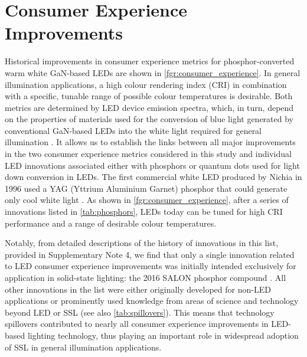 \documentclass[parskip=full]{article}
\begin{document}
\section{Consumer Experience Improvements}

Historical improvements in consumer experience metrics for phosphor-converted warm white GaN-based LEDs are shown in \cref{fgr:consumer_experience}. In general illumination applications, a high colour rendering index (CRI) in combination with a specific, tunable range of possible colour temperatures is desirable. Both metrics are determined by LED device emission spectra, which, in turn, depend on the properties of materials used for the conversion of blue light generated by conventional GaN-based LEDs into the white light required for general illumination . It allows us to establish the links between all major improvements in the two consumer experience metrics considered in this study and individual LED innovations  associated either with phosphors or quantum dots used for light down conversion in LEDs. The first commercial white LED produced by Nichia in 1996 used a YAG (Yttrium Aluminium Garnet) phosphor that could generate only cool white light \cite{bando1998development}. As shown in \cref{fgr:consumer_experience}, after a series of innovations listed in \cref{tab:phosphors}, LEDs today can be tuned for high CRI performance and a range of desirable colour temperatures.  

Notably, from detailed descriptions of the history of innovations in this list, provided in Supplementary Note 4, we find that only a single innovation related to LED consumer experience improvements was initially intended exclusively for application in solid-state lighting: the 2016 SALON phosphor compound \cite{Hoerder2019,seibald2019phosphor}. All other innovations in the list were either originally developed for non-LED applications or prominently used knowledge from areas of science and technology beyond LED or SSL (see also \cref{tab:spillovers}). This means that technology spillovers contributed to nearly all consumer experience improvements in LED-based lighting technology, thus playing an important role in widespread adoption of SSL in general illumination applications. 
\end{document}
